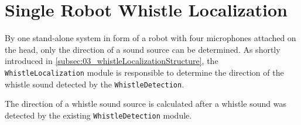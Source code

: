 \section{Single Robot Whistle Localization}
\label{subsec:03_singleRobot}

By one stand-alone system in form of a robot with four microphones
attached on the head, only the direction of a sound source can be
determined.
As shortly introduced in \cref{subsec:03_whistleLocalizationStructure},
the \lstinline!WhistleLocalization! module is responsible to
determine the direction of the whistle sound detected by the \lstinline!WhistleDetection!.

The direction of a whistle sound source is calculated after a whistle sound was detected
by the existing \lstinline!WhistleDetection! module.


